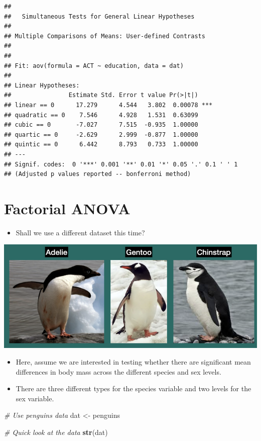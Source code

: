 \documentclass[
]{book}
\newenvironment{Shaded}{\begin{snugshade}}{\end{snugshade}}
\newcommand{\CommentTok}[1]{\textcolor[rgb]{0.56,0.35,0.01}{\textit{#1}}}
\newcommand{\FunctionTok}[1]{\textcolor[rgb]{0.13,0.29,0.53}{\textbf{#1}}}
\newcommand{\NormalTok}[1]{#1}
\newcommand{\OtherTok}[1]{\textcolor[rgb]{0.56,0.35,0.01}{#1}}
\providecommand{\tightlist}{%
  \setlength{\itemsep}{0pt}\setlength{\parskip}{0pt}}
\begin{document}
\begin{verbatim}
## 
##   Simultaneous Tests for General Linear Hypotheses
## 
## Multiple Comparisons of Means: User-defined Contrasts
## 
## 
## Fit: aov(formula = ACT ~ education, data = dat)
## 
## Linear Hypotheses:
##                Estimate Std. Error t value Pr(>|t|)    
## linear == 0      17.279      4.544   3.802  0.00078 ***
## quadratic == 0    7.546      4.928   1.531  0.63099    
## cubic == 0       -7.027      7.515  -0.935  1.00000    
## quartic == 0     -2.629      2.999  -0.877  1.00000    
## quintic == 0      6.442      8.793   0.733  1.00000    
## ---
## Signif. codes:  0 '***' 0.001 '**' 0.01 '*' 0.05 '.' 0.1 ' ' 1
## (Adjusted p values reported -- bonferroni method)
\end{verbatim}

\section{Factorial ANOVA}\label{factorial-anova}

\begin{itemize}
\tightlist
\item
  Shall we use a different dataset this time?
\end{itemize}

\includegraphics{./img/penguines.png}

\begin{itemize}
\item
  Here, assume we are interested in testing whether there are significant mean differences in body mass across the different species and sex levels.
\item
  There are three different types for the species variable and two levels for the sex variable.
\end{itemize}

\begin{Shaded}
\begin{Highlighting}[]
\CommentTok{\# Use penguins data}
\NormalTok{dat }\OtherTok{\textless{}{-}}\NormalTok{ penguins}

\CommentTok{\# Quick look at the data}
\FunctionTok{str}\NormalTok{(dat)}
\end{Highlighting}
\end{Shaded}
\end{document}
